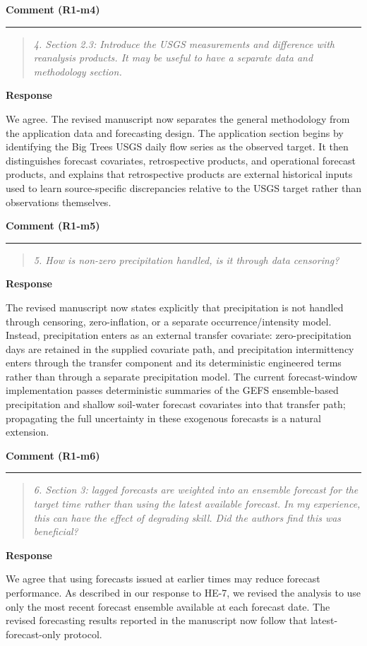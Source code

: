 \documentclass[11pt,letterpaper]{article}
\newcommand{\commentheading}[1]{%
  \vspace{6pt}\noindent\textbf{Comment (#1)}\par
  \vspace{2pt}\hrule\vspace{6pt}
}
\newenvironment{commentblock}{\begin{quote}\small\itshape}{\end{quote}}
\newcommand{\responseheading}{%
  \vspace{2pt}\noindent\textbf{Response}\par
}
\newenvironment{responsebox}{\begin{mdframed}[style=plainbox]}{\end{mdframed}}
\newcommand{\HE}[1]{HE-#1}
\newcommand{\Ronem}[1]{R1-m#1}
\begin{document}
\commentheading{\Ronem{4}}
\begin{commentblock}
4. Section 2.3: Introduce the USGS measurements and difference with reanalysis products. It may be useful to have a separate data and methodology section.
\end{commentblock}
\responseheading
\begin{responsebox}
We agree. The revised manuscript now separates the general methodology from the application data and forecasting design. The application section begins by identifying the Big Trees USGS daily flow series as the observed target. It then distinguishes forecast covariates, retrospective products, and operational forecast products, and explains that retrospective products are external historical inputs used to learn source-specific discrepancies relative to the USGS target rather than observations themselves.
\end{responsebox}

\commentheading{\Ronem{5}}
\begin{commentblock}
5. How is non-zero precipitation handled, is it through data censoring?
\end{commentblock}
\responseheading
\begin{responsebox}
The revised manuscript now states explicitly that precipitation is not handled through censoring, zero-inflation, or a separate occurrence/intensity model. Instead, precipitation enters as an external transfer covariate: zero-precipitation days are retained in the supplied covariate path, and precipitation intermittency enters through the transfer component and its deterministic engineered terms rather than through a separate precipitation model. The current forecast-window implementation passes deterministic summaries of the GEFS ensemble-based precipitation and shallow soil-water forecast covariates into that transfer path; propagating the full uncertainty in these exogenous forecasts is a natural extension.
\end{responsebox}

\commentheading{\Ronem{6}}
\begin{commentblock}
6. Section 3: lagged forecasts are weighted into an ensemble forecast for the target time rather than using the latest available forecast. In my experience, this can have the effect of degrading skill. Did the authors find this was beneficial?
\end{commentblock}
\responseheading
\begin{responsebox}
We agree that using forecasts issued at earlier times may reduce forecast performance. As described in our response to \HE{7}, we revised the analysis to use only the most recent forecast ensemble available at each forecast date. The revised forecasting results reported in the manuscript now follow that latest-forecast-only protocol.
\end{responsebox}
\end{document}
